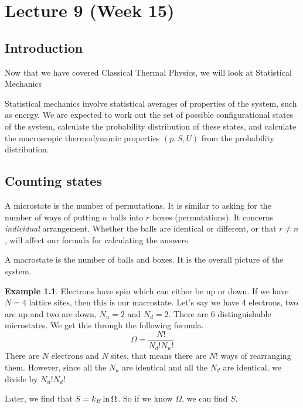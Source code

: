 \documentclass[12pt,chapterprefix=false,dvipsnames]{scrbook}
\theoremstyle{dotless}
\theoremstyle{definition}
\newtheorem{protoexample}{Example}[section]
\newenvironment{example}
{\colorlet{shadecolor}{red!15}\begin{shaded}\begin{protoexample}}
			{\end{protoexample}\end{shaded}}
\begin{document}
\chapter{Lecture 9 (Week 15)}%
\label{cha:lecture_9}

\section{Introduction}%
\label{sec:int}

Now that we have covered Classical Thermal Physics, we will look
at Statistical Mechanics

Statistical mechanics involve statistical averages of properties
of the system, such as energy. We are expected to work out the
set of possible configurational states of the system, calculate
the probability distribution of these states, and calculate the
macroscopic thermodynamic properties $(p, S, U)$
from the probability distribution.

\section{Counting states}%
\label{sec:counting_states}

A microstate is the number of permutations. It is similar to
asking for the number of ways of putting $n$
balls into $r$ boxes (permutations). It
concerns \textit{individual} arrangement. Whether the balls
are identical or different, or that $r \neq n$,
will affect our formula for calculating the answers.

A macrostate is the number of balls and boxes. It is the overall
picture of the system.

\begin{example}
	Electrons have spin which can either be up or down. If we have
	$N = 4$ lattice sites, then this is our
	macrostate. Let's say we have 4 electrons, two are up and two
	are down, $N_u = 2$ and $N_d = 2$.
	There are 6 distinguishable microstates. We get this through the
	following formula.
	\begin{equation}
		\Omega = \frac{N!}{N_d! N_u!}
	\end{equation}
	There are $N$ electrons and
	$N$ sites, that means there are
	$N!$ ways of rearranging them. However, since
	all the $N_u$ are identical and all the
	$N_d$ are identical, we divide by
	$N_u! N_d!$

	Later, we find that $S = k_B \naturallogarithm{\Omega}$. So if we know
	$\Omega$, we can find $S$.

\end{example}
\end{document}
